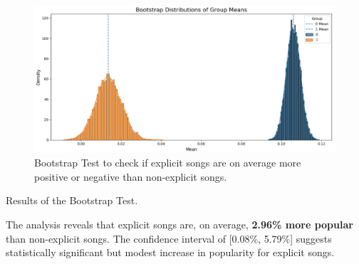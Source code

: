 \begin{center}
\begin{figure}[H]
  \centering
  \includegraphics[width=5in]{img/explicitness_bootstrap_2.png}
  \caption{Bootstrap Test to check if explicit songs are on average more
  positive or negative than non-explicit songs.}
  \label{Figure:fig_bh}
\end{figure}
\end{center}



\begin{table}[H]
\centering
\caption{Results of the Bootstrap Test.}
\end{table}


The analysis reveals that explicit songs are, on average, \textbf{2.96\% more
popular} than non-explicit songs. The confidence interval of [0.08\%, 5.79\%]
suggests statistically significant but modest increase in popularity for
explicit songs.

